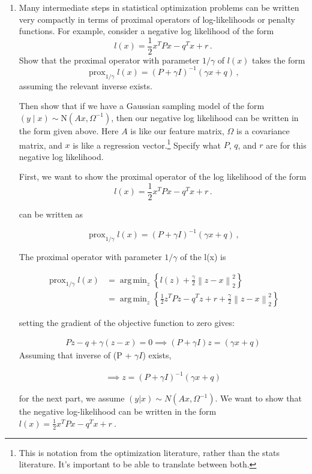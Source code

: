 \documentclass{article}
\DeclareMathOperator*{\argmin}{arg\,min}
\DeclareMathOperator*{\prox}{prox}
\newcommand{\norm}[1]{\left\lVert#1\right\rVert}
\newcommand{\N}{\mbox{N}}
\begin{document}
\begin{enumerate}[label=(\Alph*)]
{}

\item Many intermediate steps in statistical optimization problems can be written very compactly in terms of proximal operators of log-likelihoods or penalty functions.  For example, consider a negative log likelihood of the form
$$
l(x) = \frac{1}{2} x^{T} P x - q^{T} x + r \, .
$$
Show that the proximal operator with parameter $1/\gamma$ of $l(x)$ takes the form
$$
\prox_{1/\gamma} l(x) = (P + \gamma I)^{-1} (\gamma  x + q) \, ,
$$
assuming the relevant inverse exists. 

Then show that if we have a Gaussian sampling model of the form $(y \mid x) \sim \N(Ax, \Omega^{-1})$, then our negative log likelihood can be written in the form given above.  Here $A$ is like our feature matrix, $\Omega$ is a covariance matrix, and $x$ is like a regression vector.\footnote{This is notation from the optimization literature, rather than the stats literature.  It's important to be able to translate between both.}  Specify what $P$, $q$, and $r$ are for this negative log likelihood.

{\color{blue}
First, we want to show the proximal operator of the log likelihood of the form 
$$
l(x) = \frac{1}{2} x^{T} P x - q^{T} x + r \, .
$$

can be written as 

$$
\prox_{1/\gamma} l(x) = (P + \gamma I)^{-1} (\gamma  x + q) \, ,
$$

The proximal operator with parameter $1/\gamma$ of the l(x) is

\begin{align}
		\prox_{1 / \gamma} l(x) &= \argmin_z \left \{ l(z) + \frac{\gamma}{2} \norm{z-x}_2^2 \right \} \\
		&= \argmin_z \left \{ \frac{1}{2}z^T P z - q^T z + r + \frac{\gamma}{2} \norm{z-x}_2^2 \right \}
\end{align}

setting the gradient of the objective function to zero gives:

\begin{align}
		Pz - q + \gamma(z - x) = 0 \implies
		(P + \gamma I)z = (\gamma x + q) 
	\end{align}
Assuming that inverse of (P + $\gamma I$) exists,

\begin{align}
\implies z = (P + \gamma I)^{-1}(\gamma x + q)
\end{align}


for the next part, we assume $(y|x) \sim N(Ax, \Omega^{-1})$. We want to show that the negative log-likelihood can be written in the form $l(x) = \frac{1}{2} x^{T} P x - q^{T} x + r \ $.

}
\end{enumerate}
\end{document}
